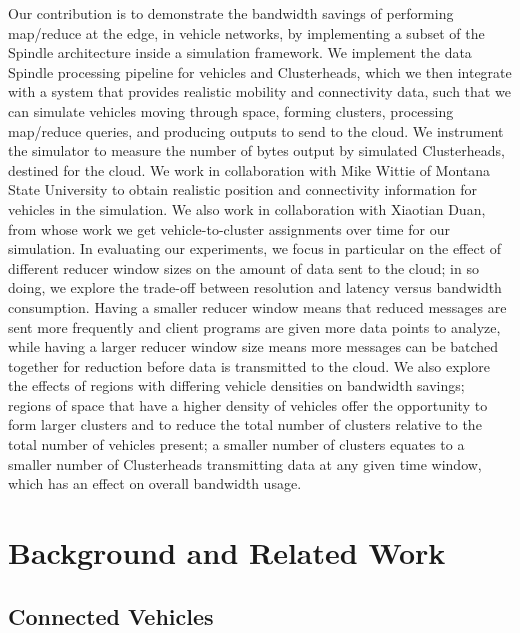 \documentclass{thesis}
\begin{document}
    Our contribution is to demonstrate the bandwidth savings of performing map/reduce at the edge, in
    vehicle networks, by implementing a subset of the Spindle architecture inside a simulation framework.
    We implement the data Spindle processing pipeline for vehicles and Clusterheads, which we then integrate
    with a system that provides realistic mobility and connectivity data, such that we can simulate vehicles
    moving through space, forming clusters, processing map/reduce queries, and producing outputs to send to
    the cloud. We instrument the simulator to measure the number of bytes output by simulated Clusterheads,
    destined for the cloud. We work in collaboration with Mike Wittie of Montana State University to obtain
    realistic position and connectivity information for vehicles in the simulation. We also work in
    collaboration with Xiaotian Duan, from whose work we get vehicle-to-cluster assignments over time
    for our simulation. In evaluating our experiments, we focus in particular on the effect of different
    reducer window sizes on the amount of data sent to the cloud; in so doing, we explore the trade-off
    between resolution and latency versus bandwidth consumption. Having a smaller reducer window means
    that reduced messages are sent more frequently and client programs are given more data points to
    analyze, while having a larger reducer window size means more messages can be batched together for
    reduction before data is transmitted to the cloud. We also explore the effects of regions with
    differing vehicle densities on bandwidth savings; regions of space that have a higher density
    of vehicles offer the opportunity to form larger clusters and to reduce the total number
    of clusters relative to the total number of vehicles present; a smaller number of clusters
    equates to a smaller number of Clusterheads transmitting data at any given time window, which
    has an effect on overall bandwidth usage.

\chapter{Background and Related Work}
    \section{Connected Vehicles}
\end{document}
